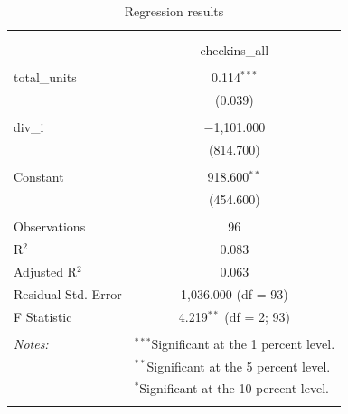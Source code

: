 \documentclass{article}\usepackage[]{graphicx}\usepackage[]{color}
\begin{document}
\begin{table}[!htbp] \centering 
  \caption{Regression results} 
  \label{} 
\begin{tabular}{@{\extracolsep{5pt}}lc} 
\\[-1.8ex]\hline 
\hline \\[-1.8ex] 
\\[-1.8ex] & checkins\_all \\ 
\hline \\[-1.8ex] 
 total\_units & 0.114$^{***}$ \\ 
  & (0.039) \\ 
  & \\ 
 div\_i & $-$1,101.000 \\ 
  & (814.700) \\ 
  & \\ 
 Constant & 918.600$^{**}$ \\ 
  & (454.600) \\ 
  & \\ 
Observations & 96 \\ 
R$^{2}$ & 0.083 \\ 
Adjusted R$^{2}$ & 0.063 \\ 
Residual Std. Error & 1,036.000 (df = 93) \\ 
F Statistic & 4.219$^{**}$ (df = 2; 93) \\ 
\hline \\[-1.8ex] 
\textit{Notes:} & \multicolumn{1}{l}{$^{***}$Significant at the 1 percent level.} \\ 
 & \multicolumn{1}{l}{$^{**}$Significant at the 5 percent level.} \\ 
 & \multicolumn{1}{l}{$^{*}$Significant at the 10 percent level.} \\ 
\normalsize 
\end{tabular} 
\end{table} 
\end{document}
